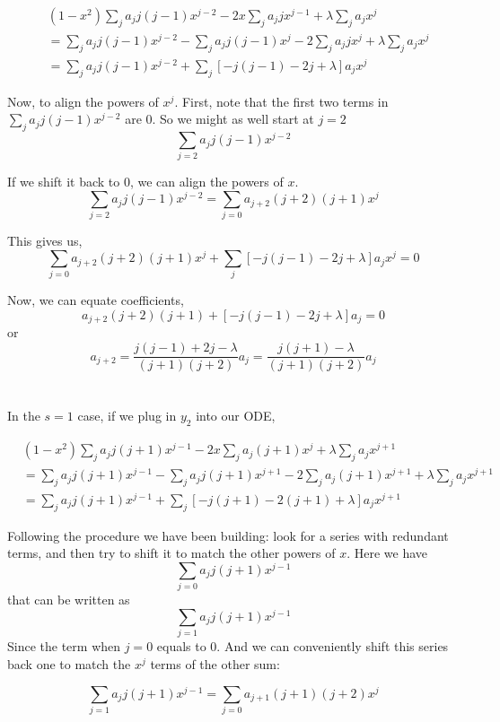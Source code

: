 \begin{align*}
& (1-x^2) \sum_j a_j j(j-1) x^{j-2}
    - 2x \sum_j a_j j x^{j-1}
    + \lambda \sum_j a_j x^j \\
&= \sum_j a_j j(j-1) x^{j-2}
    - \sum_j a_j j(j-1) x^{j}
    - 2 \sum_j a_j j x^{j}
    + \lambda \sum_j a_j x^j \\
&= \sum_j a_j j(j-1) x^{j-2}
    + \sum_j \left[ -j(j-1) -2j + \lambda \right] a_j x^j
\end{align*}

Now, to align the powers of $x^{j}$.
First, note that the first two terms in
$\sum_j a_j j(j-1) x^{j-2}$ are $0$.
So we might as well start at $j=2$
$$
\sum_{j=2} a_j j(j-1) x^{j-2}
$$

If we shift it back to $0$, we can align the powers of $x$.
$$
\sum_{j=2} a_j j(j-1) x^{j-2} =
\sum_{j=0} a_{j+2} (j+2)(j+1) x^{j}
$$

This gives us,
$$
\sum_{j=0} a_{j+2} (j+2)(j+1) x^{j}
+ \sum_j \left[ -j(j-1) -2j + \lambda \right] a_j x^j
= 0
$$

Now, we can equate coefficients,
$$
a_{j+2} (j+2)(j+1)
    + \left[ -j(j-1) -2j + \lambda \right] a_j = 0
$$
or
$$
a_{j+2} = \frac{ j(j-1) + 2j - \lambda }{ (j+1)(j+2) } a_j
= \frac{ j(j+1) - \lambda  }{ (j+1)(j+2) } a_j
$$
\\~\\

In the $s=1$ case, if we plug in $y_2$ into our ODE,

\begin{align*}
& (1-x^2) \sum_j a_j j(j+1) x^{j-1}
    - 2x \sum_j a_j (j+1) x^{j}
    + \lambda \sum_j a_j x^{j+1} \\
&= \sum_j a_j j(j+1) x^{j-1}
    - \sum_j a_j j(j+1) x^{j+1}
    - 2 \sum_j a_j (j+1) x^{j+1}
    + \lambda \sum_j a_j x^{j+1} \\
&= \sum_j a_j j(j+1) x^{j-1}
    + \sum_j \left[ -j(j+1) -2(j+1) + \lambda \right] a_j x^{j+1}
\end{align*}

Following the procedure we have been building: look for a series with redundant terms, and then try to shift it to match
the other powers of $x$.
Here we have
$$
\sum_{j=0} a_j j(j+1) x^{j-1}
$$
that can be written as
$$
\sum_{j=1} a_j j(j+1) x^{j-1}
$$
Since the term when $j=0$ equals to 0.
And we can conveniently shift this series back one to match the $x^j$ terms of the other sum:

$$
\sum_{j=1} a_j j(j+1) x^{j-1}
=
\sum_{j=0} a_{j+1} (j+1)(j+2) x^{j}
$$

